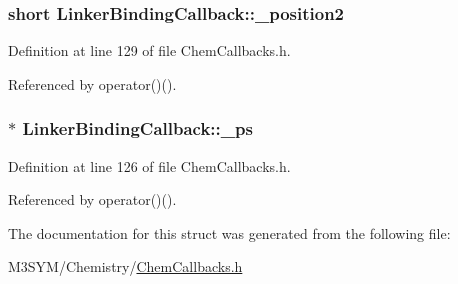 \hypertarget{structLinkerBindingCallback_a4e8615d697d56b1ef6c444d890b70dd8}{
\subsubsection[{\+\_\+position2}]{\setlength{\rightskip}{0pt plus 5cm}short Linker\+Binding\+Callback\+::\+\_\+position2}}\label{structLinkerBindingCallback_a4e8615d697d56b1ef6c444d890b70dd8}


Definition at line 129 of file Chem\+Callbacks.\+h.



Referenced by operator()().

\hypertarget{structLinkerBindingCallback_a11d2f4631dae2753a09ca815597959f7}{
\subsubsection[{\+\_\+ps}]{$\ast$ Linker\+Binding\+Callback\+::\+\_\+ps}}\label{structLinkerBindingCallback_a11d2f4631dae2753a09ca815597959f7}


Definition at line 126 of file Chem\+Callbacks.\+h.



Referenced by operator()().



The documentation for this struct was generated from the following file\+:\begin{DoxyCompactItemize}
\item 
M3\+S\+Y\+M/\+Chemistry/\hyperlink{ChemCallbacks_8h}{Chem\+Callbacks.\+h}\end{DoxyCompactItemize}
